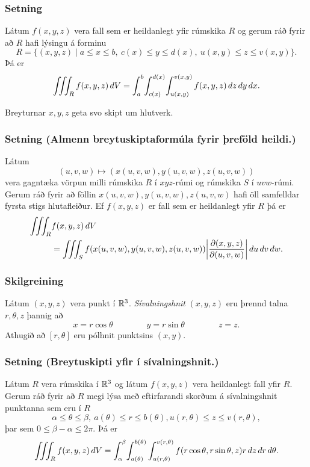 \subsubsection{Setning }
 Látum $f(x,y,z)$ vera fall sem er heildanlegt yfir rúmskika $R$ og gerum ráð fyrir að $R$ hafi lýsingu á forminu
$$R=\{(x,y,z)\mid a\leq x\leq b,\ c(x)\leq y\leq d(x),\ u(x,y)\leq z\leq v(x,y)\}.$$
Þá er
$$\thrint_R f(x,y,z)\,dV=
\int_a^b\!\int_{c(x)}^{d(x)}\!\int_{u(x,y)}^{v(x,y)} f(x,y,z)\,dz\,dy\,dx.$$

Breyturnar $x, y, z$ geta svo skipt um hlutverk.



\subsubsection{Setning (Almenn breytuskiptaformúla fyrir þreföld heildi.) }
 Látum 
$$(u,v,w)\mapsto (x(u,v,w), y(u,v,w), z(u,v,w))$$
vera gagntæka vörpun milli rúmskika $R$ í $xyz$-rúmi og rúmskika $S$ í $uvw$-rúmi.  Gerum ráð fyrir að föllin $x(u,v,w), y(u,v,w), z(u,v,w)$ hafi öll samfelldar fyrsta stigs hlutafleiður.  Ef $f(x,y,z)$ er fall sem er heildanlegt yfir $R$ þá er
\begin {align*}
\thrint_R& f(x,y,z)\,dV \\&=\thrint_S f(x(u,v,w), y(u,v,w), z(u,v,w))
\bigg|\frac{\partial(x,y,z)}{\partial(u,v,w)}\bigg|\,du\,dv\,dw.
\end {align*}


\subsubsection{Skilgreining }
 Látum $(x,y,z)$ vera punkt í ${\mathbb R}^3$.  {\em Sívalningshnit} $(x,y,z)$ eru þrennd talna $r, \theta, z$ þannig að 
$$x=r\cos\theta\qquad\qquad y=r\sin\theta\qquad\qquad z=z.$$
Athugið að $[r,\theta]$ eru pólhnit punktsins $(x,y)$. 


\subsubsection{Setning (Breytuskipti yfir í sívalningshnit.)}

Látum $R$ vera rúmskika í ${\mathbb R}^3$ og látum $f(x,y,z)$ vera heildanlegt fall yfir $R$.  Gerum ráð fyrir að $R$ megi lýsa með eftirfarandi skorðum á sívalningshnit punktanna sem eru í $R$
$$\alpha\leq \theta\leq \beta,\ a(\theta)\leq r\leq  b(\theta), u(r,\theta)\leq z\leq v(r,\theta),$$ 
þar sem $0\leq \beta-\alpha\leq 2\pi$.  Þá er
$$\int\!\!\!\int\!\!\!\int_R f(x,y,z)\,dV= 
\int_\alpha^\beta
\!\int_{a(\theta)}^{b(\theta)}\int_{u(r,\theta)}^{v(r,\theta)}      
f(r\cos\theta,r\sin\theta,z)r\,dz\,dr\,d\theta.$$
 



